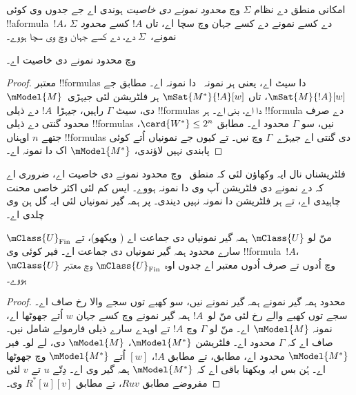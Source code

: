 \documentclass[../../../include/open-logic-section]{subfiles}
\begin{document}


\begin{defn}
  امکانی منطق دے نظام $\Sigma$ وچ \emph{محدود نمونے دی خاصیت} ہوندی اے جے جدوں وی کوئی !!a{formula}~$!A$، $\Sigma$ دے کسے نمونے دے کسے جہان وچ سچا اے، تاں $!A$ کسے \emph{محدود} نمونے،~$\Sigma$ دے، دے کسے جہان وچ وی سچا ہووے۔
\end{defn}

\begin{prop}
   وچ محدود نمونے دی خاصیت اے۔
\end{prop}

\begin{proof}
   معتبر !!{formula}s دا سیٹ اے، یعنی ہر نمونہ~ دا نمونہ اے۔
   مطابق جے
  $\mSat{M}{!A}[w]$، تاں $\mSat{M^*}{!A}[w]$ ہر فلٹریشن لئی جیہڑی~$\mModel{M}$ دی، سیٹ $\Gamma$ راہیں، جیہڑا~$!A$ دے ذیلی !!{formula}s دا اے، بنی اے۔ ہر !!{formula} دے صرف محدود گنتی دے ذیلی !!{formula}s نیں، سو
  $\Gamma$ محدود اے۔  مطابق
  $\card{W^*} \le 2^n$، جتھے $n$ اوہناں !!{formula}s دی گنتی اے جیہڑے~$\Gamma$ وچ نیں۔ تے کیوں جے  نمونیاں اُتے کوئی پابندی نہیں لاؤندی،
  $\mModel{M^*}$ اک  دا نمونہ اے۔
\end{proof}

فلٹریشناں نال ایہ وکھاؤن لئی کہ منطق~ وچ محدود نمونے دی خاصیت اے، ضروری اے کہ  دے نمونے دی فلٹریشن آپ وی  دا نمونہ ہووے۔ ایس کم لئی اکثر خاصی محنت چاہیدی اے، تے ہر فلٹریشن  دا نمونہ نہیں دیندی۔ پر ہمہ گیر نمونیاں لئی ایہ گل ہن وی چلدی اے۔

\begin{prop}
  منّ لو $\mClass{U}$ ہمہ گیر نمونیاں دی جماعت اے (
   ویکھو)، تے $\mClass{U}_\mathrm{Fin}$ سارے محدود ہمہ گیر نمونیاں دی جماعت اے۔ فیر کوئی وی !!{formula}~$!A$، $\mClass{U}$ وچ اُدوں تے صرف اُدوں معتبر اے جدوں اوہ
  $\mClass{U}_\mathrm{Fin}$ وچ معتبر ہووے۔
\end{prop}

\begin{proof}
  محدود ہمہ گیر نمونے ہمہ گیر نمونے نیں، سو کھبے توں سجے والا رخ صاف اے۔ سجے توں کھبے والے رخ لئی منّ لو~$!A$ ہمہ گیر نمونے
  وچ کسے جہان $w$ اُتے جھوٹھا اے، نمونہ $\mModel{M}$ اے۔ منّ لو $\Gamma$ وچ $!A$ تے اوہدے سارے ذیلی فارمولے شامل نیں۔ صاف اے کہ $\Gamma$ محدود اے۔ فلٹریشن
  $\mModel{M^*}$، $\mModel{M}$ دی، لے لو۔ فیر $\mModel{M^*}$ محدود اے،
   مطابق، تے  مطابق $!A$، $[w]$ اُتے
  $\mModel{M^*}$ وچ جھوٹھا اے۔ ہُن بس ایہ ویکھنا باقی اے کہ $\mModel{M^*}$ ہمہ گیر وی اے۔ دِتّے $u$ تے $v$ لئی مفروضے مطابق $Ruv$، تے
   مطابق
  $R^*[u][v]$ وی۔
\end{proof}
\end{document}
